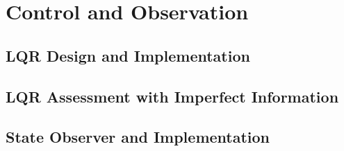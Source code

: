 
\section{Control and Observation}
\subsection{LQR Design and Implementation}
\subsection{LQR Assessment with Imperfect Information}
\subsection{State Observer and Implementation}